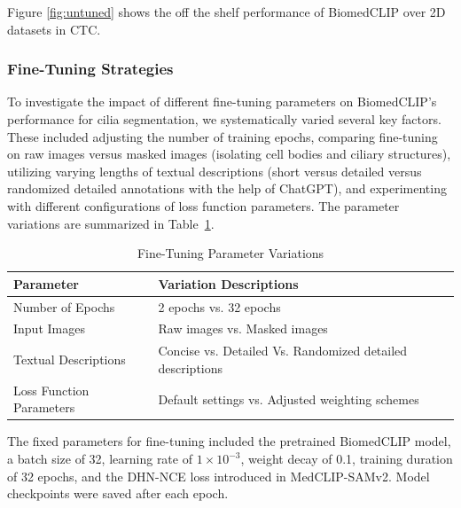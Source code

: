 \documentclass[./dissertation.tex]{subfiles}
\begin{document}
Figure \ref{fig:untuned} shows the off the shelf performance of BiomedCLIP over 2D datasets in CTC.


\subsubsection{Fine-Tuning Strategies}



To investigate the impact of different fine-tuning parameters on BiomedCLIP's performance for cilia segmentation, we systematically varied several key factors. These included adjusting the number of training epochs, comparing fine-tuning on raw images versus masked images (isolating cell bodies and ciliary structures), utilizing varying lengths of textual descriptions (short versus detailed versus randomized detailed annotations with the help of ChatGPT), and experimenting with different configurations of loss function parameters. The parameter variations are summarized in Table~\ref{tab:fine-tune-params}.

\begin{table}[htbp]
    \centering
    \caption{Fine-Tuning Parameter Variations}
    \label{tab:fine-tune-params}
    \begin{tabular}{ll}
        \toprule
        \textbf{Parameter}       & \textbf{Variation Descriptions}                           \\ \midrule
        Number of Epochs         & 2 epochs vs. 32 epochs                                    \\
        Input Images             & Raw images vs. Masked images                              \\
        Textual Descriptions     & Concise vs. Detailed Vs. Randomized detailed descriptions \\
        Loss Function Parameters & Default settings vs. Adjusted weighting schemes           \\
        \bottomrule
    \end{tabular}
\end{table}
The fixed parameters for fine-tuning included the pretrained BiomedCLIP model, a batch size of 32, learning rate of \(1\times10^{-3}\), weight decay of 0.1, training duration of 32 epochs, and the DHN-NCE loss introduced in MedCLIP-SAMv2. Model checkpoints were saved after each epoch.
\end{document}
